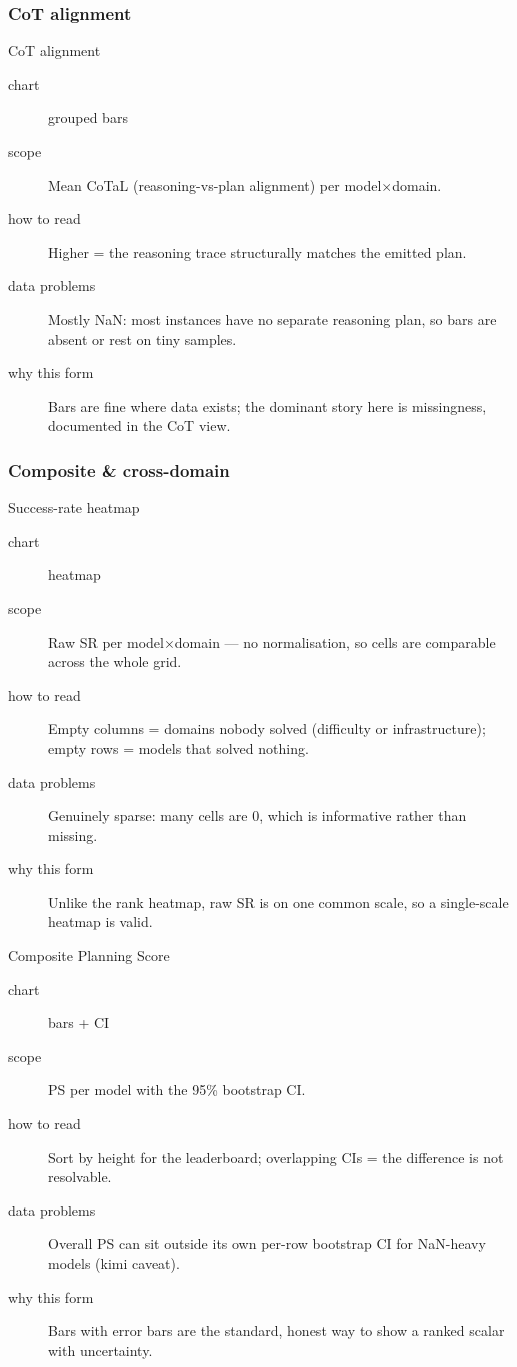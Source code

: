 \subsubsection{CoT alignment}

\begin{bmplotcard}{CoT alignment}
\begin{description}
\item[chart] grouped bars
\item[scope] Mean CoTaL (reasoning-vs-plan alignment) per model\(\times\)domain.
\item[how to read] Higher = the reasoning trace structurally matches the emitted plan.
\item[data problems] Mostly NaN: most instances have no separate reasoning plan, so bars are absent or rest on tiny samples.
\item[why this form] Bars are fine where data exists; the dominant story here is missingness, documented in the CoT view.
\end{description}
\end{bmplotcard}

\subsubsection{Composite \& cross-domain}

\begin{bmplotcard}{Success-rate heatmap}
\begin{description}
\item[chart] heatmap
\item[scope] Raw SR per model\(\times\)domain --- no normalisation, so cells are comparable across the whole grid.
\item[how to read] Empty columns = domains nobody solved (difficulty or infrastructure); empty rows = models that solved nothing.
\item[data problems] Genuinely sparse: many cells are 0, which is informative rather than missing.
\item[why this form] Unlike the rank heatmap, raw SR is on one common scale, so a single-scale heatmap is valid.
\end{description}
\end{bmplotcard}

\begin{bmplotcard}{Composite Planning Score}
\begin{description}
\item[chart] bars + CI
\item[scope] PS per model with the 95\% bootstrap CI.
\item[how to read] Sort by height for the leaderboard; overlapping CIs = the difference is not resolvable.
\item[data problems] Overall PS can sit outside its own per-row bootstrap CI for NaN-heavy models (kimi caveat).
\item[why this form] Bars with error bars are the standard, honest way to show a ranked scalar with uncertainty.
\end{description}
\end{bmplotcard}

